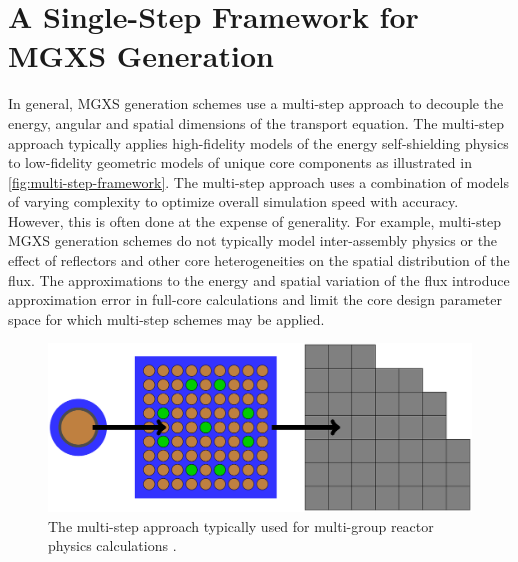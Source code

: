 \section{A Single-Step Framework for MGXS Generation}
\label{sec:single-step}

In general, MGXS generation schemes use a multi-step approach to decouple the energy, angular and spatial dimensions of the transport equation. The multi-step approach typically applies high-fidelity models of the energy self-shielding physics to low-fidelity geometric models of unique core components as illustrated in \autoref{fig:multi-step-framework}. The multi-step approach uses a combination of models of varying complexity to optimize overall simulation speed with accuracy. However, this is often done at the expense of generality. For example, multi-step MGXS generation schemes do not typically model inter-assembly physics or the effect of reflectors and other core heterogeneities on the spatial distribution of the flux. The approximations to the energy and spatial variation of the flux introduce approximation error in full-core calculations and limit the core design parameter space for which multi-step schemes may be applied. 

\begin{figure}[h!]
\centering
\includegraphics[width=0.8\linewidth]{figures/multi-step-flow-chart}
\caption{The multi-step approach typically used for multi-group reactor physics calculations \cite{gibson2016thesis}.}
\label{fig:multi-step-framework}
\end{figure}


